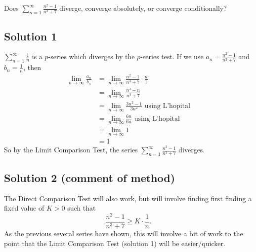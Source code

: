 \documentclass{article}
\begin{document}
\noindent
Does $\displaystyle \sum_{n=1}^\infty \frac{n^2-1}{n^3+7}$
diverge, converge absolutely, or converge conditionally?

\subsection*{Solution 1}

$\displaystyle \sum_{n=1}^\infty \frac1{n}$ is a $p$-series which diverges by the $p$-series test. If we use $a_n = \frac{n^2-1}{n^3+7}$ and $b_n = \frac1{n}$, then
\begin{align*}
\lim_{n \to \infty} \frac{a_n}{b_n}
&= \lim_{n \to \infty} \frac{n^2-1}{n^3+7} \cdot \frac{n}{1}\\
&= \lim_{n \to \infty} \frac{n^3-n}{n^3+7} \\
&= \lim_{n \to \infty} \frac{3n^2-1}{3n^2} \text{ using L'hopital}\\
&= \lim_{n \to \infty} \frac{6n}{6n} \text{ using L'hopital}\\
&= \lim_{n \to \infty} 1\\
&= 1
\end{align*}
So by the Limit Comparison Test, the series $\displaystyle \sum_{n=1}^\infty \frac{n^2-1}{n^3+7}$ diverges.

\subsection*{Solution 2 (comment of method)}

The Direct Comparison Test will also work, but will involve finding first finding a fixed value of $K > 0$ such that
\[ \frac{n^2-1}{n^3+7} \geq K \cdot \frac1n.\]
As the previous several series have shown, this will involve a bit of work to the point that the Limit Comparison Test (solution 1) will be easier/quicker.
\end{document}
